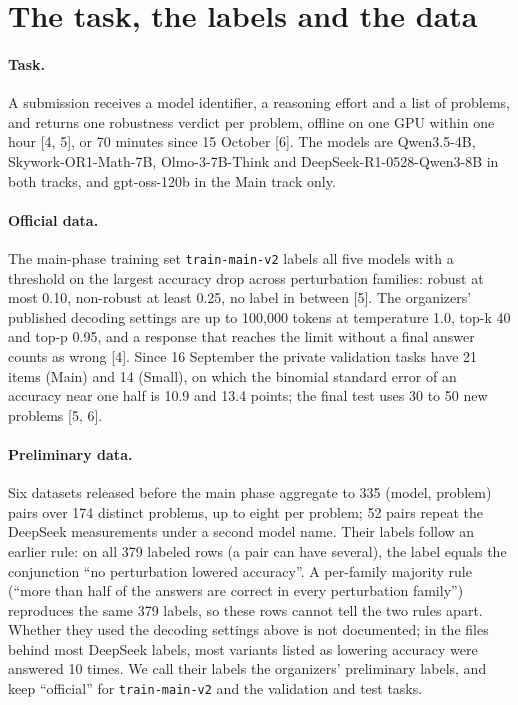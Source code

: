\documentclass{article}
\begin{document}
\section{The task, the labels and the data}\label{sec:data}

\paragraph{Task.} A submission receives a model identifier, a reasoning effort and a list of problems, and returns one robustness verdict per problem, offline on one GPU within one hour [4, 5], or 70 minutes since 15 October [6]. The models are Qwen3.5-4B, Skywork-OR1-Math-7B, Olmo-3-7B-Think and \mbox{DeepSeek-R1-0528-Qwen3-8B} in both tracks, and gpt-oss-120b in the Main track only.

\paragraph{Official data.} The main-phase training set \texttt{train-main-v2} labels all five models with a threshold on the largest accuracy drop across perturbation families: robust at most 0.10, non-robust at least 0.25, no label in between [5]. The organizers' published decoding settings are up to 100,000 tokens at temperature 1.0, top-k 40 and top-p 0.95, and a response that reaches the limit without a final answer counts as wrong [4]. Since 16 September the private validation tasks have 21 items (Main) and 14 (Small), on which the binomial standard error of an accuracy near one half is 10.9 and 13.4 points; the final test uses 30 to 50 new problems [5, 6].

\paragraph{Preliminary data.} Six datasets released before the main phase aggregate to 335 (model, problem) pairs over 174 distinct problems, up to eight per problem; 52 pairs repeat the DeepSeek measurements under a second model name. Their labels follow an earlier rule: on all 379 labeled rows (a pair can have several), the label equals the conjunction ``no perturbation lowered accuracy''. A per-family majority rule (``more than half of the answers are correct in every perturbation family'') reproduces the same 379 labels, so these rows cannot tell the two rules apart. Whether they used the decoding settings above is not documented; in the files behind most DeepSeek labels, most variants listed as lowering accuracy were answered 10 times. We call their labels the organizers' preliminary labels, and keep ``official'' for \texttt{train-main-v2} and the validation and test tasks.
\end{document}
